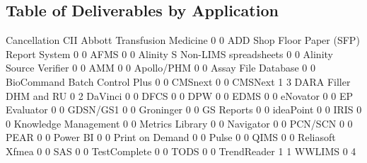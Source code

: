 \documentclass{article}
\begin{document}
\subsection{Table of Deliverables by Application}
\begin{Schunk}
\begin{Soutput}
                                           Cancellation CII
  Abbott Transfusion Medicine                         0   0
  ADD Shop Floor Paper (SFP) Report System            0   0
  AFMS                                                0   0
  Alinity S Non-LIMS spreadsheets                     0   0
  Alinity Source Verifier                             0   0
  AMM                                                 0   0
  Apollo/PHM                                          0   0
  Assay File Database                                 0   0
  BioCommand Batch Control Plus                       0   0
  CMSnext                                             0   0
  CMSNext                                             1   3
  DARA Filler DHM and RU                              0   2
  DaVinci                                             0   0
  DFCS                                                0   0
  DPW                                                 0   0
  EDMS                                                0   0
  eNovator                                            0   0
  EP Evaluator                                        0   0
  GDSN/GS1                                            0   0
  Groninger                                           0   0
  GS Reports                                          0   0
  ideaPoint                                           0   0
  IRIS                                                0   0
  Knowledge Management                                0   0
  Metrics Library                                     0   0
  Navigator                                           0   0
  PCN/SCN                                             0   0
  PEAR                                                0   0
  Power BI                                            0   0
  Print on Demand                                     0   0
  Pulse                                               0   0
  QIMS                                                0   0
  Reliasoft Xfmea                                     0   0
  SAS                                                 0   0
  TestComplete                                        0   0
  TODS                                                0   0
  TrendReader                                         1   1
  WWLIMS                                              0   4


\end{Soutput}
\end{Schunk}
\end{document}
